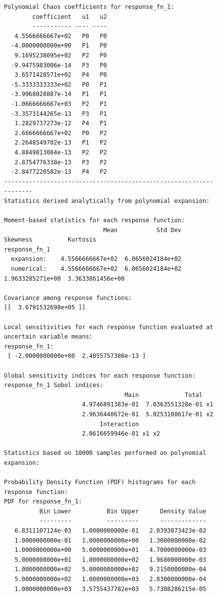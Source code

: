 \begin{figure}
\centering
\begin{bigbox}
\begin{scriptsize}
\begin{verbatim}
Polynomial Chaos coefficients for response_fn_1:
        coefficient   u1   u2
        ----------- ---- ----
   4.5566666667e+02   P0   P0
  -4.0000000000e+00   P1   P0
   9.1695238095e+02   P2   P0
  -9.9475983006e-14   P3   P0
   3.6571428571e+02   P4   P0
  -5.3333333333e+02   P0   P1
  -3.9968028887e-14   P1   P1
  -1.0666666667e+03   P2   P1
  -3.3573144265e-13   P3   P1
   1.2829737273e-12   P4   P1
   2.6666666667e+02   P0   P2
   2.2648549702e-13   P1   P2
   4.8849813084e-13   P2   P2
   2.8754776338e-13   P3   P2
  -2.8477220582e-13   P4   P2
-------------------------------------------------------------------
Statistics derived analytically from polynomial expansion:

Moment-based statistics for each response function:
                            Mean           Std Dev          Skewness          Kurtosis
response_fn_1
  expansion:    4.5566666667e+02  6.0656024184e+02
  numerical:    4.5566666667e+02  6.0656024184e+02  1.9633285271e+00  3.3633861456e+00

Covariance among response functions:
[[  3.6791532698e+05 ]] 

Local sensitivities for each response function evaluated at uncertain variable means:
response_fn_1:
 [ -2.0000000000e+00  2.4055757386e-13 ] 

Global sensitivity indices for each response function:
response_fn_1 Sobol indices:
                                  Main             Total
                      4.9746891383e-01  7.0363551328e-01 x1
                      2.9636448672e-01  5.0253108617e-01 x2
                           Interaction
                      2.0616659946e-01 x1 x2 

Statistics based on 10000 samples performed on polynomial expansion:

Probability Density Function (PDF) histograms for each response function:
PDF for response_fn_1:
          Bin Lower          Bin Upper      Density Value
          ---------          ---------      -------------
   6.8311107124e-03   1.0000000000e-01   2.0393073423e-02
   1.0000000000e-01   1.0000000000e+00   1.3000000000e-02
   1.0000000000e+00   5.0000000000e+01   4.7000000000e-03
   5.0000000000e+01   1.0000000000e+02   1.9680000000e-03
   1.0000000000e+02   5.0000000000e+02   9.2150000000e-04
   5.0000000000e+02   1.0000000000e+03   2.8300000000e-04
   1.0000000000e+03   3.5755437782e+03   5.7308286215e-05


\end{verbatim}
\end{scriptsize}
\end{bigbox}
\end{figure}
